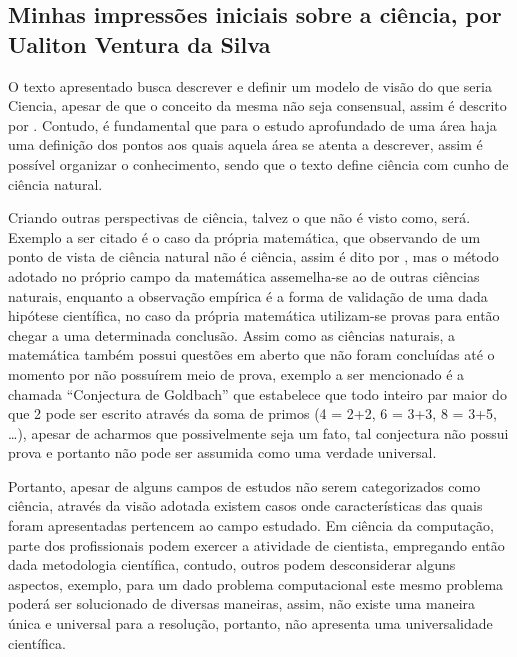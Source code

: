 \subsection{Minhas impressões iniciais sobre a ciência, por Ualiton Ventura da Silva}

O texto apresentado busca descrever e definir um modelo de visão do que seria \gls{Ciencia}, apesar de que o conceito da mesma não seja consensual, assim é descrito por \citep{schwartzman_ciencia_1984}. Contudo, é fundamental que para o estudo aprofundado de uma área haja  uma definição dos pontos aos quais aquela área se atenta a descrever, assim é possível organizar o conhecimento, sendo que o texto define ciência com cunho de ciência natural.

Criando outras perspectivas de ciência, talvez o que não é visto como, será. Exemplo a ser citado é o caso da própria matemática, que observando de um ponto de vista de ciência natural não é ciência, assim é dito por \citep{bilaniuk_is_nodate}, mas o método adotado no próprio campo da matemática assemelha-se ao de outras ciências naturais, enquanto a observação empírica é a forma de validação de uma dada hipótese científica, no caso da própria matemática utilizam-se provas para então chegar a uma determinada conclusão. Assim como as ciências naturais, a matemática também possui questões em aberto que não foram concluídas até o momento por não possuírem meio de prova, exemplo a ser mencionado é a chamada “Conjectura de Goldbach” \citep{noauthor_goldbachs_2022} que estabelece que todo inteiro par maior do que 2 pode ser escrito através da soma de primos (4 = 2+2, 6 = 3+3, 8 = 3+5, …), apesar de acharmos que possivelmente seja um fato, tal conjectura não possui prova e portanto não pode ser assumida como uma verdade universal.

Portanto, apesar de alguns campos de estudos não serem categorizados como ciência, através da visão adotada existem casos onde características das quais foram apresentadas pertencem ao campo estudado. Em ciência da computação, parte dos profissionais podem exercer a atividade de cientista, empregando então dada metodologia científica, contudo, outros podem desconsiderar alguns aspectos, exemplo, para um dado problema computacional este mesmo problema poderá ser solucionado de diversas maneiras, assim, não existe uma maneira única e universal para a resolução, portanto, não apresenta uma universalidade científica.
